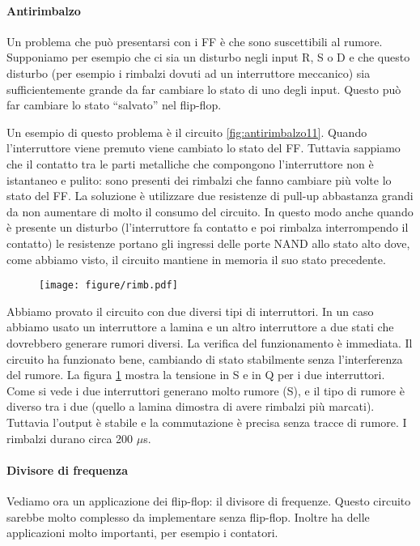 \paragraph{Antirimbalzo}

Un problema che può presentarsi con i FF è che sono suscettibili al rumore. Supponiamo per esempio che
ci sia un disturbo negli input R, S o D e che questo disturbo (per esempio i rimbalzi dovuti ad un
interruttore meccanico) sia sufficientemente grande da far cambiare lo stato di uno degli input.
Questo può far cambiare lo stato ``salvato'' nel flip-flop.


Un esempio di questo problema è il circuito \ref{fig:antirimbalzo11}. Quando l'interruttore viene premuto
viene cambiato lo stato del FF. Tuttavia sappiamo che il contatto tra le parti metalliche che compongono l'interruttore
non è istantaneo e pulito: sono presenti dei rimbalzi che fanno cambiare più volte lo stato del FF.
La soluzione è utilizzare due resistenze di pull-up abbastanza grandi da non aumentare di molto il consumo del circuito.
In questo modo anche quando è presente un disturbo (l'interruttore fa contatto e poi rimbalza interrompendo il contatto)
le resistenze portano gli ingressi delle porte NAND allo stato alto dove, come abbiamo visto,
il circuito mantiene in memoria il suo stato precedente.

\begin{figure}
	\centering
	\texttt{[image: figure/rimb.pdf]}
	\caption{}
	\label{fig:rimb11}
\end{figure}

Abbiamo provato il circuito con due diversi tipi di interruttori. In un caso abbiamo usato un interruttore a lamina
e un altro interruttore a due stati che dovrebbero generare rumori diversi. La verifica del funzionamento è immediata. Il circuito ha funzionato bene,
cambiando di stato stabilmente senza l'interferenza del rumore. La figura \ref{fig:rimb11} mostra la tensione in S e in Q
per i due interruttori. Come si vede i due interruttori generano molto rumore (S), e il tipo di rumore è diverso tra i due
(quello a lamina dimostra di avere rimbalzi più marcati). Tuttavia l'output è stabile e la commutazione è precisa senza
tracce di rumore. I rimbalzi durano circa 200 $\mu$s.

\paragraph{Divisore di frequenza}

Vediamo ora un applicazione dei flip-flop: il divisore di frequenze. Questo circuito sarebbe molto complesso da
implementare senza flip-flop. Inoltre ha delle applicazioni molto importanti, per esempio i contatori.

